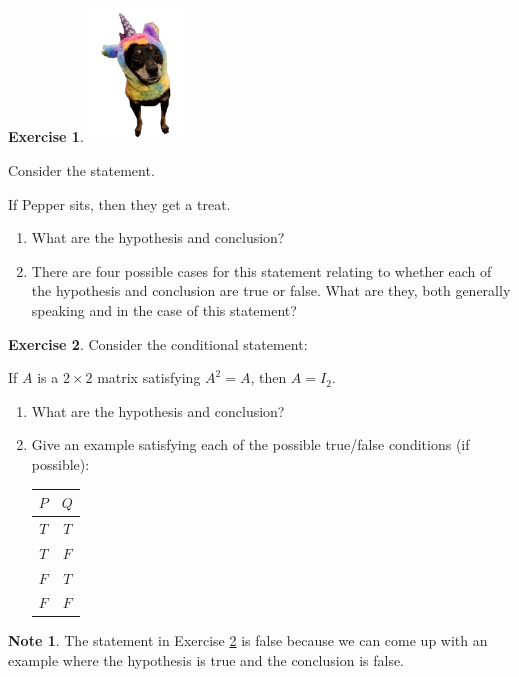 \documentclass[handout]{beamer}
\newcommand{\fn}{\insertframenumber}
\theoremstyle{definition}
\newtheorem{exercise}{Exercise}
\newtheorem*{nb}{Note}
\begin{document}
\begin{frame}{\fn}
	\begin{exercise}
		\begin{minipage}{1in}
			\includegraphics[width=1in]{images/uni_pepper}
		\end{minipage}
		\begin{minipage}{.75\textwidth}
			Consider the statement.
			
		\begin{center}
			If  Pepper sits, then they get a treat.
		\end{center}
		\begin{enumerate}[label=(\alph*)]
			\item What are the hypothesis and conclusion?
			\item There are four possible cases for this statement relating to whether each of the hypothesis and conclusion are true or false.  What are they, both generally speaking and in the case of this statement?
		\end{enumerate}
		\end{minipage}
	\end{exercise}
\end{frame}
\begin{frame}{\fn}
	\begin{exercise}\label{idem}
		Consider the conditional statement: 
		
		If $A$ is a $2\times 2$ matrix satisfying $A^2=A$, then $A=I_2$.
		\begin{enumerate}[label=(\alph*)]
			\item What are the hypothesis and conclusion?
			\item Give an example satisfying each of the possible true/false conditions (if possible):
				\begin{center}
					\begin{tabular}{c|c}
					$P$&$Q$\\
					\hline
					$T$&$T$\\
					$T$&$F$\\
					$F$&$T$\\
					$F$&$F$
				\end{tabular}
				\end{center}
		\end{enumerate}
	\end{exercise}
	\begin{nb}
		The statement in Exercise \ref{idem} is false because we can come up with an example where the hypothesis is true and the conclusion is false.  
	\end{nb}
\end{frame}
\end{document}
